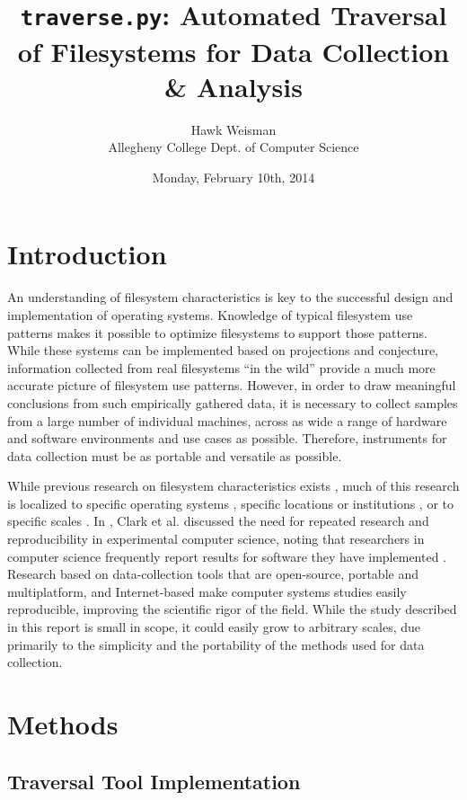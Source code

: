 \documentclass[12pt,letterpaper]{article}
\author{Hawk Weisman\\Allegheny College Dept. of Computer Science}
\title{\texttt{traverse.py}: Automated Traversal of Filesystems for Data Collection \& Analysis}
\date{Monday, February 10th, 2014}
\begin{document}
	\maketitle
	\tableofcontents
	\section{Introduction}
		
		An understanding of filesystem characteristics is key to the successful design and implementation of operating systems. Knowledge of typical filesystem use patterns makes it possible to optimize filesystems to support those patterns. While these systems can be implemented based on projections and conjecture, information collected from real filesystems ``in the wild'' provide a much more accurate picture of filesystem use patterns. However, in order to draw meaningful conclusions from such empirically gathered data, it is necessary to collect samples from a large number of individual machines, across as wide a range of hardware and software environments and use cases as possible. Therefore, instruments for data collection must be as portable and versatile as possible.

		While previous research on filesystem characteristics exists \cite{agrawal2007five,evans2002study,leung2008measurement}, much of this research is localized to specific operating systems \cite{agrawal2007five}, specific locations or institutions \cite{agrawal2007five,evans2002study}, or to specific scales \cite{leung2008measurement}. In \citeyear{clark2004xen}, Clark et al. discussed the need for repeated research and reproducibility in experimental computer science, noting that researchers in computer science frequently report results for software they have implemented \cite{clark2004xen}. Research based on data-collection tools that are open-source, portable and multiplatform, and Internet-based make computer systems studies easily reproducible, improving the scientific rigor of the field. While the study described in this report is small in scope, it could easily grow to arbitrary scales, due primarily to the simplicity and the portability of the methods used for data collection.

	\section{Methods}

		\subsection{Traversal Tool Implementation}
\end{document}
